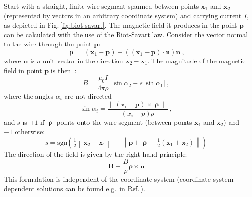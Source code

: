 Start with a straight, finite wire segment spanned between points $\mathbf{x}_1$ and $\mathbf{x}_2$ (represented by vectors in an arbitrary coordinate system) and carrying current $I$, as depicted in Fig.\,\ref{fig:biot-savart}. The magnetic field it produces in the point $\mathbf{p}$ can be calculated with the use of the Biot-Savart law. Consider the vector normal to the wire through the point $\mathbf{p}$:
\begin{equation}
  \boldsymbol{\uprho} = (\mathbf{x}_1 - \mathbf{p}) - \left( \left( \mathbf{x}_1 - \mathbf{p} \right) \cdot \mathbf{n} \right)\mathbf{n} \ ,
\end{equation}
where $\mathbf{n}$ is a unit vector in the direction $\mathbf{x}_2 -\mathbf{x}_1$. The magnitude of the magnetic field in point $\mathbf{p}$ is then~\cite{Griffith}:
\begin{equation}
  \label{eq:biot_savart}
  B = \frac{\mu_0 I}{4 \pi \rho} \, \left| \sin \alpha_2 + s\, \sin \alpha_1 \right| \ ,
\end{equation}
where the angles $\alpha_i$ are not directed
\begin{equation}
  \sin \alpha_i = \frac{ \left\lVert \left( \mathbf{x}_i - \mathbf{p} \right) \times \boldsymbol{\uprho} \right\rVert }{ (x_i  - p) \rho } \ ,
\end{equation}
and $s$ is $+1$ if $\boldsymbol{\uprho}$ points onto the wire segment (between points $\mathbf{x}_1$ and $\mathbf{x}_2$) and $-1$ otherwise:
\begin{equation}
  s = \mathrm{sgn}\left( \tfrac{1}{2} \left\lVert \mathbf{x}_2 - \mathbf{x}_1 \right\rVert -
  \left\lVert \mathbf{p} + \boldsymbol{\uprho} - \tfrac{1}{2} \left( \mathbf{x}_1 + \mathbf{x}_2 \right) \right\rVert \right)
\end{equation}
The direction of the field is given by the right-hand principle:
\begin{equation}
  \mathbf{B} = \frac{B}{\rho} \boldsymbol{\rho} \times \mathbf{n}
\end{equation}
This formulation is independent of the coordinate system (coordinate-system dependent solutions can be found e.g.\ in Ref.\,\cite{Grivich2000}).

